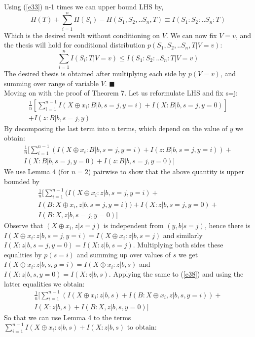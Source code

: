 Using (\ref{e33}) n-1 times we can upper bound LHS by,
\begin{equation}
H(T)+\sum_{i=1}^{n}H(S_i)-H(S_1,S_2,..S_n,T)\equiv I(S_1:S_2:..S_n:T)
\end{equation}
Which is the desired result without conditioning on $V$. We can now fix $V=v$, and the thesis will hold for conditional distribution $p(S_1,S_2,..S_n,T|V=v)$:
\begin{equation}
\sum_{i=1}^n I(S_i:T|V=v) \leq I(S_1:S_2:..S_n:T|V=v)
\end{equation}
The desired thesis is obtained after multiplying each side by $p(V=v)$, and summing over range of variable $V$. $\blacksquare$ \\
Moving on with the proof of Theorem 7. Let us reformulate LHS and fix s=j:
\begin{multline}
 \frac{1}{n}[\sum_{i=1}^{n-1}I(X\oplus x_i:B|b,s=j,y=i) + I(X:B|b,s=j,y=0)] \\ \nonumber
+I(z:B|b,s=j,y) 
\end{multline}
By decomposing the last term into $n$ terms, which depend on the value of $y$ we obtain:
\begin{multline}
 \frac{1}{n}[\sum_{i=1}^{n-1}(I(X\oplus x_i:B|b,s=j,y=i) + I(z:B|b,s=j,y=i))+ \\
I(X:B|b,s=j,y=0) + I(z:B|b,s=j,y=0)]
\end{multline}
We use Lemma 4 (for $n=2$) pairwise to show that the above quantity is upper bounded by
\begin{multline}\label{e38}
\frac{1}{n}[\sum_{i=1}^{n-1}(I(X\oplus x_i:z|b,s=j,y=i) + \\ I(B:X\oplus x_i,z|b,s=j,y=i))+
I(X:z|b,s=j,y=0) + \\ I(B:X,z|b,s=j,y=0)]
\end{multline}
Observe that $(X\oplus x_i,z|s=j)$ is independent from $(y,b|s=j)$, hence there is $I(X\oplus x_i:z|b,s=j,y=i)=I(X\oplus x_i:z|b,s=j)$ and similarly $I(X:z|b,s=j,y=0)=I(X:z|b,s=j)$. Multiplying both sides these equalities by $p(s=i)$ and summing up over values of $s$ we get $I(X\oplus x_i:z|b,s,y=i)=I(X\oplus x_i:z|b,s)$ and $I(X:z|b,s,y=0)=I(X:z|b,s)$. Applying the same to (\ref{e38}) and using the latter equalities we obtain:
\begin{multline}\label{e38}
\frac{1}{n}[\sum_{i=1}^{n-1}(I(X\oplus x_i:z|b,s) + I(B:X\oplus x_i,z|b,s,y=i))+ \\
I(X:z|b,s) + I(B:X,z|b,s,y=0)]
\end{multline}
So that we can use Lemma 4 to the terms $\sum_{i=1}^{n-1}I(X\oplus x_i:z|b,s)+I(X:z|b,s)$ to obtain:
